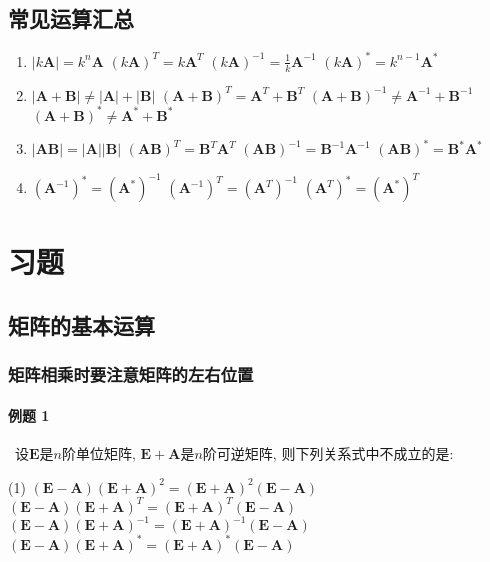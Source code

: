 \subsection{常见运算汇总}
\begin{enumerate}
\item
\subitem $ |k\bm{A}|=k^{n}\bm{A} $
\subitem $ (k\bm{A})^{T}=k\bm{A}^{T} $
\subitem $ (k\bm{A})^{-1}=\frac{1}{k}\bm{A}^{-1} $
\subitem $ (k\bm{A})^{*}=k^{n-1}\bm{A}^{*} $
\item
\subitem $ |\bm{A}+\bm{B}|\neq |\bm{A}|+|\bm{B}| $
\subitem $ (\bm{A}+\bm{B})^{T}=\bm{A}^{T}+\bm{B}^{T} $
\subitem $ (\bm{A}+\bm{B})^{-1}\neq \bm{A}^{-1}+\bm{B}^{-1} $
\subitem $ (\bm{A}+\bm{B})^{*}\neq \bm{A}^{*}+\bm{B}^{*} $
\item
\subitem $ |\bm{A}\bm{B}|=|\bm{A}||\bm{B}| $
\subitem $ (\bm{A}\bm{B})^{T}=\bm{B}^{T}\bm{A}^{T} $
\subitem $ (\bm{A}\bm{B})^{-1}=\bm{B}^{-1}\bm{A}^{-1} $
\subitem $ (\bm{A}\bm{B})^{*}=\bm{B}^{*}\bm{A}^{*} $
\item
\subitem $ (\bm{A}^{-1})^{*}=(\bm{A}^{*})^{-1} $
\subitem $ (\bm{A}^{-1})^{T}=(\bm{A}^{T})^{-1} $
\subitem $ (\bm{A}^{T})^{*}=(\bm{A}^{*})^{T} $
\end{enumerate}
\section{习题}
\subsection{矩阵的基本运算}
\subsubsection{矩阵相乘时要注意矩阵的左右位置}
\paragraph{例题 1}~设$ \bm{E} $是$ n $阶单位矩阵, $ \bm{E}+\bm{A} $是$ n $阶可逆矩阵, 则下列关系式中不成立的是:
\begin{tasks}[label-offset={0.8em},label-format={\bfseries}](1)
\task $ (\bm{E}-\bm{A})(\bm{E}+\bm{A})^{2}=(\bm{E}+\bm{A})^{2}(\bm{E}-\bm{A}) $
\task $ (\bm{E}-\bm{A})(\bm{E}+\bm{A})^{T}=(\bm{E}+\bm{A})^{T}(\bm{E}-\bm{A}) $
\task $ (\bm{E}-\bm{A})(\bm{E}+\bm{A})^{-1}=(\bm{E}+\bm{A})^{-1}(\bm{E}-\bm{A}) $
\task $ (\bm{E}-\bm{A})(\bm{E}+\bm{A})^{*}=(\bm{E}+\bm{A})^{*}(\bm{E}-\bm{A}) $
\end{tasks} \par
